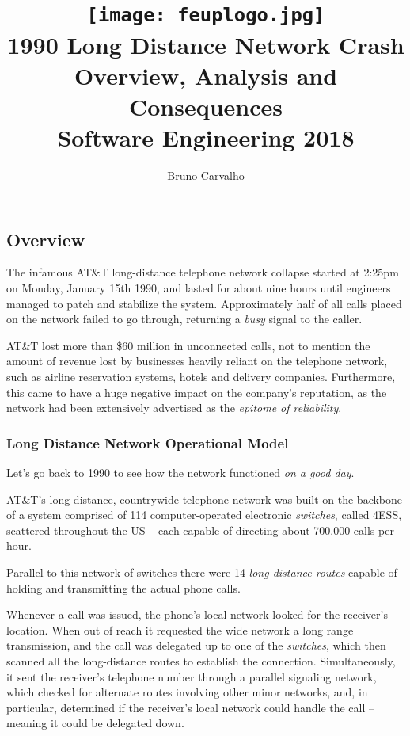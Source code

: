 \documentclass[12pt,a4paper,notitlepage]{article}
\title{
	\vspace{-2\baselineskip}
	\texttt{[image: feuplogo.jpg]}\\
	{\Huge \att{} 1990 Long Distance Network Crash}\\
	{\Large Overview, Analysis and Consequences}\\
	{\normalsize Software Engineering 2018}
}
\author{
	Bruno Carvalho \hspace*{1em} \text{up201606517}
}
\newcommand*{\att}{AT\&T}
\begin{document}
\maketitle
\thispagestyle{empty}

\subsection{Overview}

The infamous \att{} long-distance telephone network collapse started at 2:25pm on Monday, January 15th 1990, and lasted for about nine hours until engineers managed to patch and stabilize the system.\supercite{att-dennisburke1995}
Approximately half of all calls placed on the network failed to go through, returning a \emph{busy} signal to the caller.

\att{} lost more than \$60 million in unconnected calls, not to mention the amount of revenue lost by businesses heavily reliant on the telephone network, such as airline reservation systems, hotels and delivery companies. Furthermore, this came to have a huge negative impact on the company's reputation, as the network had been extensively advertised as the \textsl{epitome of reliability}.\supercite{att-popularscience1990}

\subsubsection{Long Distance Network Operational Model}

Let's go back to 1990 to see how the network functioned \textsl{on a good day}.

\att{}'s long distance, countrywide telephone network was built on the backbone of a system comprised of 114 computer-operated electronic \emph{switches}, called 4ESS, scattered throughout the US -- each capable of directing about 700.000 calls per hour.

Parallel to this network of switches there were 14 \emph{long-distance routes} capable of holding and transmitting the actual phone calls.\supercite{att-dennisburke1995}

Whenever a call was issued, the phone's local network looked for the receiver's location.
When out of reach it requested the wide network a long range transmission, and the call was delegated up to one of the \emph{switches}, which then scanned all the long-distance routes to establish the connection.
Simultaneously, it sent the receiver's telephone number through a parallel signaling network, which checked for alternate routes involving other minor networks, and, in particular, determined if the receiver's local network could handle the call -- meaning it could be delegated down.
\end{document}
